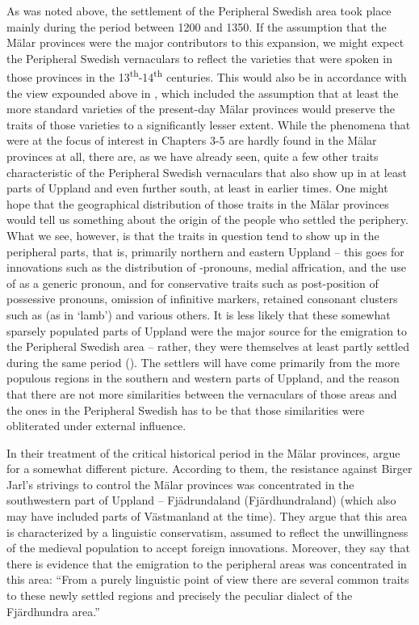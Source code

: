 As was noted above, the settlement of the Peripheral Swedish area took place mainly during the period between 1200 and 1350. If the assumption that the Mälar provinces were the major contributors to this expansion, we might expect the Peripheral Swedish vernaculars to reflect the varieties that were spoken in those provinces in the 13\textsuperscript{th}{}-14\textsuperscript{th} centuries. This would also be in accordance with the view expounded above in , which included the assumption that at least the more standard varieties of the present-day Mälar provinces would preserve the traits of those varieties to a significantly lesser extent. While the phenomena that were at the focus of interest in Chapters 3{}-5 are hardly found in the Mälar provinces at all, there are, as we have already seen, quite a few other traits characteristic of the Peripheral Swedish vernaculars that also show up in at least parts of Uppland and even further south, at least in earlier times. One might hope that the geographical distribution of those traits in the Mälar provinces would tell us something about the origin of the people who settled the periphery. What we see, however, is that the traits in question tend to show up in the peripheral parts, that is, primarily northern and eastern Uppland – this goes for innovations such as the distribution of -pronouns, medial affrication, and the use of  as a generic pronoun, and for conservative traits such as post-position of possessive pronouns, omission of infinitive markers, retained consonant clusters such as (as in ‘lamb’)\textit{ }and various others. It is less likely that these somewhat sparsely populated parts of Uppland were the major source for the emigration to the Peripheral Swedish area – rather, they were themselves at least partly settled during the same period (\citealt{Broberg1990}). The settlers will have come primarily from the more populous regions in the southern and western parts of Uppland, and the reason that there are not more similarities between the vernaculars of those areas and the ones in the Peripheral Swedish has to be that those similarities were obliterated under external influence. 

In their treatment of the critical historical period in the Mälar provinces, \citet{LindströmEtAl2006} argue for a somewhat different picture. According to them, the resistance against Birger Jarl’s strivings to control the Mälar provinces was concentrated in the southwestern part of Uppland – Fjädrundaland (Fjärdhundraland) (which also may have included parts of Västmanland at the time). They argue that this area is characterized by a linguistic conservatism, assumed to reflect the unwillingness of the medieval population to accept foreign innovations. Moreover, they say that there is evidence that the emigration to the peripheral areas was concentrated in this area: “From a purely linguistic point of view there are several common traits to these newly settled regions and precisely the peculiar dialect of the Fjärdhundra area.”

